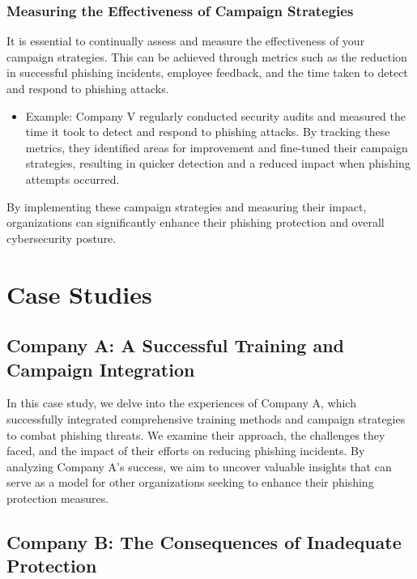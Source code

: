\documentclass[conference]{IEEEtran}
\begin{document}
\subsubsection{Measuring the Effectiveness of Campaign Strategies}
It is essential to continually assess and measure the effectiveness of your campaign strategies. This can be achieved through metrics such as the reduction in successful phishing incidents, employee feedback, and the time taken to detect and respond to phishing attacks.

\begin{itemize}
\item Example: Company V regularly conducted security audits and measured the time it took to detect and respond to phishing attacks. By tracking these metrics, they identified areas for improvement and fine-tuned their campaign strategies, resulting in quicker detection and a reduced impact when phishing attempts occurred.
\end{itemize}

By implementing these campaign strategies and measuring their impact, organizations can significantly enhance their phishing protection and overall cybersecurity posture.



\section{Case Studies}


\subsection{Company A: A Successful Training and Campaign Integration}

In this case study, we delve into the experiences of Company A, which successfully integrated comprehensive training methods and campaign strategies to combat phishing threats. We examine their approach, the challenges they faced, and the impact of their efforts on reducing phishing incidents. By analyzing Company A's success, we aim to uncover valuable insights that can serve as a model for other organizations seeking to enhance their phishing protection measures.

\subsection{Company B: The Consequences of Inadequate Protection}
\end{document}

